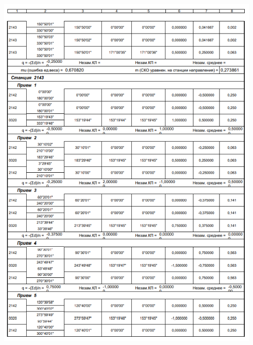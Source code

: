 \documentclass[a4paper]{article}
\begin{document}
\begin{newpage}
\begin{center}
        \includegraphics[scale=1.4]{vedomosty/скп8.png}

\end{center}
\end{newpage}
\end{document}
